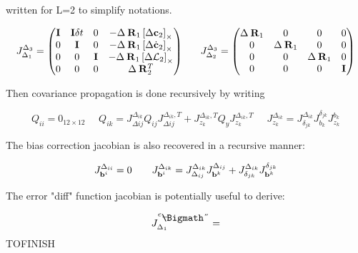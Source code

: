\documentclass[11pt]{article}
\newcommand{\Rot}[2]{\prescript{#1}{}{\bfR}_{#2}}
\newcommand{\bias}{\bfb}
\newcommand{\AM}{\mathcal{L}}
\newcommand{\COM}{\bfc}
\newcommand{\COMd}{\dot{\bfc}}
\newcommand{\Ident}{\bfI}
\def\diamondminus{\mathrel{%
		\ooalign{$-$\cr\hss\lower.255ex\hbox{\Bigmath\char5}\hss}}}
\begin{document}
written for L=2 to simplify notations.

\begin{equation}
    J^{\Delta_3}_{\Delta_1} =
    \begin{pmatrix}
    \Ident & \Ident \delta t & 0 & - \Delta \Rot{}{1} \left[\Delta \COM_2 \right]_{\times}
    \\
    0 & \Ident & 0 & - \Delta \Rot{}{1} \left[\Delta \COMd_2 \right]_{\times}
    \\
    0 & 0 & \Ident & - \Delta \Rot{}{1} \left[\Delta \AM_2 \right]_{\times}
    \\
    0 & 0 & 0 & \Delta \Rot{}{2}^T
    \end{pmatrix}
    ~~~~~
    J^{\Delta_3}_{\Delta_2} =
    \begin{pmatrix}
    \Delta \Rot{}{1} & 0 & 0 & 0
    \\
    0 & \Delta \Rot{}{1} & 0 & 0
    \\
    0 & 0 & \Delta \Rot{}{1} & 0
    \\
    0 & 0 & 0 & \Ident
    \end{pmatrix}
\end{equation}


Then covariance propagation is done recursively by writing 

\begin{equation}
    Q_{ii} = 0_{12\times 12} ~~~~~~ Q_{ik} = J^{\Delta_{ik}}_{\Delta {ij}} Q_{ij} J^{\Delta_{ik},T}_{\Delta {ij}} + J^{\Delta_{ik},T}_{z_k} Q_y J^{\Delta_{ik},T}_{z_k}  ~~~~~~ J^{\Delta_{ik}}_{z_k} = J^{\Delta_{ik}}_{\delta_{jk}} J^{\delta_{jk}}_{b_k} J^{b_k}_{z_k}
\end{equation}

The bias correction jacobian is also recovered in a recursive manner:

\begin{equation}
    J^{\Delta_{ii}}_{\bias^i} = 0 ~~~~~~  J^{\Delta_{ik}}_{\bias^i} = J^{\Delta_{ik}}_{\Delta_{ij}} J^{\Delta_{ij}}_{\bias^k} + J^{\Delta_{ik}}_{\delta_{jk}} J^{\delta_{jk}}_{\bias^k}
\end{equation}



The error "diff" function jacobian is potentially useful to derive:


\begin{equation}
	J^{e_{\diamondminus}}_{\Delta_1}=
\end{equation}
TOFINISH
\end{document}
